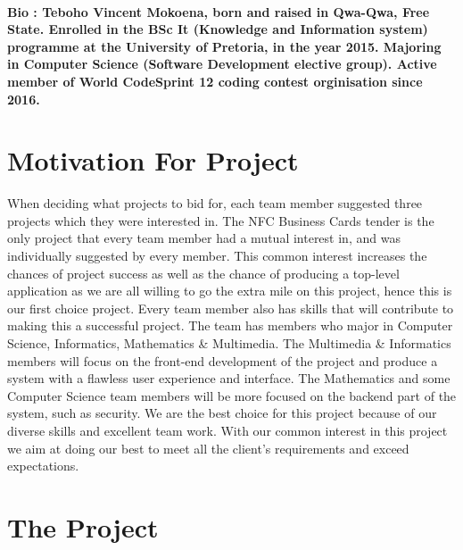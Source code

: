 \documentclass[11pt]{article}
\begin{document}
\paragraph{Bio : Teboho Vincent Mokoena, born and raised in Qwa-Qwa, Free State. Enrolled in
the BSc It (Knowledge and Information system) programme at the University of
Pretoria, in the year 2015. Majoring in Computer Science (Software
Development elective group). Active member of World CodeSprint 12 coding
contest orginisation since 2016.}

\section{Motivation For Project}
When deciding what projects to bid for, each team member suggested three projects which they were interested in. The NFC Business Cards tender is the only project that every team member had a mutual interest in, and was individually suggested by every member. This common interest increases the chances of project success as well as the chance of producing a top-level application as we are all willing to go the extra mile on this project, hence this is our first choice project.
\newline
\newline Every team member also has skills that will contribute to making this a successful project. The team has members who major in Computer Science, Informatics, Mathematics & Multimedia. The Multimedia & Informatics members will focus on the front-end development of the project and produce a system with a flawless user experience and interface. The Mathematics and some Computer Science team members will be more focused on the backend part of the system, such as security.
\newline
\newline We are the best choice for this project because of our diverse skills and excellent team work. With our common interest in this project we aim at doing our best to meet all the client's requirements and exceed expectations.

\section{The Project}
\end{document}
